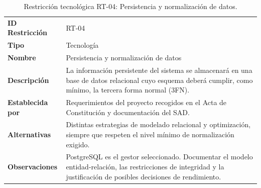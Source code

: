 \documentclass[11pt,a4paper,oneside]{article}
\begin{document}
\begingroup
\small
\setlength{\tabcolsep}{7pt}
\renewcommand{\arraystretch}{1.30}
\setlength{\anchoRegistro}{\dimexpr\textwidth-4\tabcolsep-3\arrayrulewidth\relax}
\begin{table}[H]
\centering
\caption{Restricción tecnológica RT-04: Persistencia y normalización de datos.}
\label{tab:restriccion-rt-04}
\begin{tabular}{|
>{\RaggedRight\arraybackslash}p{.28\anchoRegistro}|
>{\RaggedRight\arraybackslash}p{.72\anchoRegistro}|}
\hline
\rowcolor{negroTabla}
\multicolumn{2}{|l|}{\color{white}\bfseries Registro de Restricción Tecnológica}\\\hline
\cellcolor{azulTabla}\bfseries ID Restricción
& RT-04\\\hline
\cellcolor{azulTabla}\bfseries Tipo
& Tecnología\\\hline
\cellcolor{azulTabla}\bfseries Nombre
& Persistencia y normalización de datos\\\hline
\cellcolor{azulTabla}\bfseries Descripción
& La información persistente del sistema se almacenará en una base de datos relacional cuyo esquema deberá cumplir, como mínimo, la tercera forma normal (3FN).\\\hline
\cellcolor{azulTabla}\bfseries Establecida por
& Requerimientos del proyecto recogidos en el Acta de Constitución y documentación del SAD.\\\hline
\cellcolor{azulTabla}\bfseries Alternativas
& Distintas estrategias de modelado relacional y optimización, siempre que respeten el nivel mínimo de normalización exigido.\\\hline
\cellcolor{azulTabla}\bfseries Observaciones
& PostgreSQL es el gestor seleccionado. Documentar el modelo entidad-relación, las restricciones de integridad y la justificación de posibles decisiones de rendimiento.\\\hline
\end{tabular}
\end{table}
\endgroup
\end{document}
